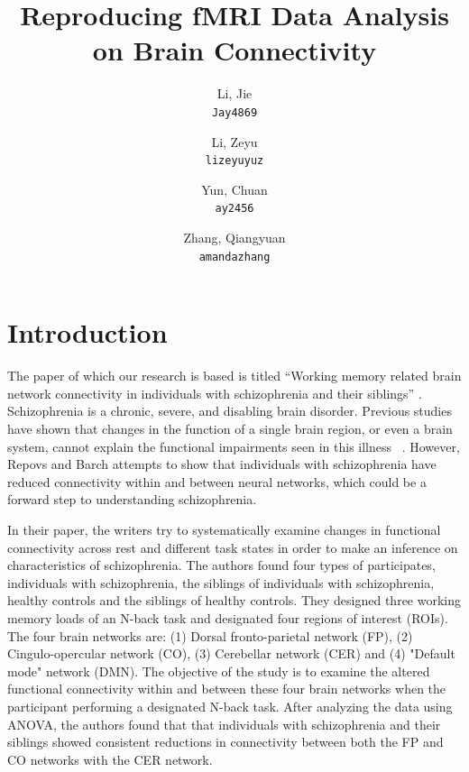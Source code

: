 \documentclass[11pt]{article}
\title{Reproducing fMRI Data Analysis on Brain Connectivity}
\author{
  Li, Jie\\
  \texttt{Jay4869}
  \and
  Li, Zeyu\\
  \texttt{lizeyuyuz}
  \and
  Yun, Chuan\\
  \texttt{ay2456}
  \and
  Zhang, Qiangyuan\\
  \texttt{amandazhang}
}
\begin{document}
\maketitle


\section{Introduction}

The paper of which our research is based is titled ``Working memory related
brain network connectivity in individuals with schizophrenia and their
siblings'' \cite{repovs_barch1, repovs_barch2}. Schizophrenia is a chronic,
severe, and disabling brain disorder. Previous studies have shown that changes
in the function of a single brain region, or even a brain system, cannot
explain the functional impairments seen in this illness \ \cite{repovs_barch1}.
However, Repovs and Barch attempts to show that individuals with schizophrenia
have reduced connectivity within and between neural networks, which could be a
forward step to understanding schizophrenia. \par

In their paper, the writers try to systematically examine changes in functional
connectivity across rest and different task states in order to make an
inference on characteristics of schizophrenia. The authors found four types of
participates, individuals with schizophrenia, the siblings of individuals with
schizophrenia, healthy controls and the siblings of healthy controls. They
designed three working memory loads of an N-back task and designated four
regions of interest (ROIs). The four brain networks are: (1) Dorsal
fronto-parietal network (FP), (2) Cingulo-opercular network (CO), (3)
Cerebellar network (CER) and (4) "Default mode" network (DMN). The objective of
the study is to examine the altered functional connectivity within and between
these four brain networks when the participant performing a designated N-back
task. After analyzing the data using ANOVA, the authors found that that
individuals with schizophrenia and their siblings showed consistent reductions
in connectivity between both the FP and CO networks with the CER network. \par
\end{document}
